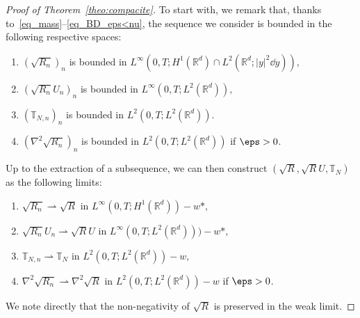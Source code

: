 \begin{proof}[Proof of Theorem~\ref{theo:compacite}]
To start with, we remark that, thanks to~\eqref{eq_mass}--\eqref{eq_BD_eps<nu}, the sequence we consider is bounded in the following respective spaces:
\begin{enumerate}\renewcommand{\theenumi}{b\arabic{enumi}}
\item \label{b1} $(\sqrt{R_n})_n$ is bounded in $L^{\infty}(0,T;H^1(\mathbb R^d) \cap L^2 (\mathbb R^d ; |y|^2 \dd y)),$
\item \label{b2} $(\sqrt{R_n}U_n)_n$ is bounded in $L^{\infty}(0,T;L^2(\mathbb R^d)),$
\item \label{b3} $(\mathbb T_{N,n})_n$ is bounded in $L^2(0,T;L^2(\mathbb R^d)).$
\item \label{b4} $(\nabla^2 \sqrt{R_n})_n$ is bounded in $L^2(0,T;L^2(\mathbb R^d))$ if $\eps >0$.
\end{enumerate}
Up to the extraction of a subsequence, we can then construct $(\sqrt{R},\sqrt{R}U,\mathbb T_N)$ as the following limits:
\begin{enumerate}\renewcommand{\theenumi}{c\arabic{enumi}}
\item \label{c1} $\sqrt{R_n} \rightharpoonup \sqrt{R}$ in $L^{\infty}(0,T;H^1(\mathbb R^d))-w*,$
\item \label{c2} $\sqrt{R_n}U_n \rightharpoonup \sqrt{R}U$ in $L^{\infty}(0,T;L^2(\mathbb R^d)))-w*,$
\item \label{c3} $\mathbb T_{N,n} \rightharpoonup \mathbb T_{N} $ in $L^2(0,T;L^2(\mathbb R^d))-w,$
\item \label{c4} $\nabla^2 \sqrt{R_n} \rightharpoonup \nabla^2 \sqrt{R} $ in $L^2(0,T;L^2(\mathbb R^d))-w$ if $\eps >0$.
\end{enumerate}
We note directly that the non-negativity of $\sqrt{R}$ is preserved in the weak limit.


\end{proof}
